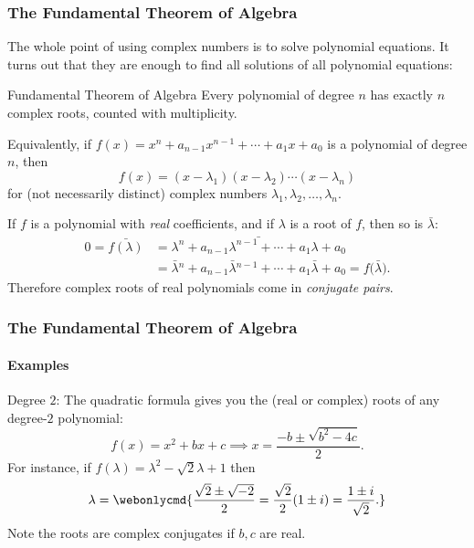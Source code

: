 
\begin{frame}
\frametitle{The Fundamental Theorem of Algebra}

The whole point of using complex numbers is to solve polynomial equations.  It
turns out that they are enough to find all solutions of all polynomial equations:

\pause
\begin{oneoffthm}{Fundamental Theorem of Algebra}
  Every polynomial of degree $n$ has exactly $n$ complex roots, counted with
  multiplicity.
\end{oneoffthm}

\pause\medskip
Equivalently, if $f(x) = x^n + a_{n-1}x^{n-1}+\cdots+a_1 x+a_0$ is a polynomial
of degree $n$, then
\[ f(x) = (x-\lambda_1)(x-\lambda_2)\cdots(x-\lambda_n) \]
for (not necessarily distinct) complex numbers
$\lambda_1,\lambda_2,\ldots,\lambda_n$. 

\pause\medskip
\begin{bluebox}[Important]{.9\linewidth}
  If $f$ is a polynomial with \emph{real} coefficients, and if $\lambda$ is a
  root of $f$, then so is $\bar\lambda$:
  \[\begin{split} 0 = \bar{f(\lambda)}
    &= \bar{\lambda^n + a_{n-1}\lambda^{n-1}+\cdots+a_1\lambda+a_0} \\
    &= \bar\lambda{}^n + a_{n-1}\bar\lambda{}^{n-1}+\cdots+a_1\bar\lambda+a_0 
    = f\bigl(\bar\lambda\bigr). \end{split}\]
  \pause
  Therefore complex roots of real polynomials come in \emph{conjugate pairs}.

\end{bluebox}

\end{frame}



\begin{frame}
\frametitle{The Fundamental Theorem of Algebra}
\framesubtitle{Examples}

\alert{Degree $2$:}
The quadratic formula gives you the (real or complex) roots of any degree-$2$
polynomial:
\[ f(x) = x^2+bx+c \implies x = \frac{-b\pm\sqrt{b^2-4c}}2. \]
\pause
For instance, if $f(\lambda) = \lambda^2 - \sqrt 2\lambda + 1$ then
\[ \lambda = \webonlycmd{\frac{\sqrt 2\pm\sqrt{-2}}2 = \frac{\sqrt 2}2(1\pm i)
  = \frac {1\pm i}{\sqrt 2}.} \]
\pause
Note the roots are complex conjugates if $b,c$ are real.

\end{frame}


